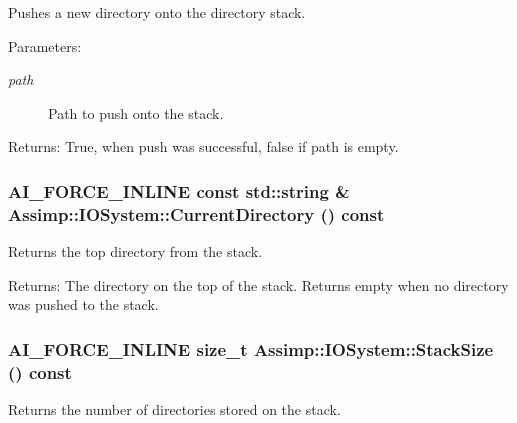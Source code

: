 Pushes a new directory onto the directory stack. 

\begin{Desc}
\item[Parameters:]
\begin{description}
\item[{\em path}]Path to push onto the stack. \end{description}
\end{Desc}
\begin{Desc}
\item[Returns:]True, when push was successful, false if path is empty. \end{Desc}
\hypertarget{class_assimp_1_1_i_o_system_9b30a76a279c6559488bdef10d5c2315}{
\subsubsection[CurrentDirectory]{\setlength{\rightskip}{0pt plus 5cm}AI\_\-FORCE\_\-INLINE const std::string \& Assimp::IOSystem::CurrentDirectory () const}}
\label{class_assimp_1_1_i_o_system_9b30a76a279c6559488bdef10d5c2315}


Returns the top directory from the stack. 

\begin{Desc}
\item[Returns:]The directory on the top of the stack. Returns empty when no directory was pushed to the stack. \end{Desc}
\hypertarget{class_assimp_1_1_i_o_system_439587c95c2ff6307e075b2437a12176}{
\subsubsection[StackSize]{\setlength{\rightskip}{0pt plus 5cm}AI\_\-FORCE\_\-INLINE size\_\-t Assimp::IOSystem::StackSize () const}}
\label{class_assimp_1_1_i_o_system_439587c95c2ff6307e075b2437a12176}


Returns the number of directories stored on the stack. 

